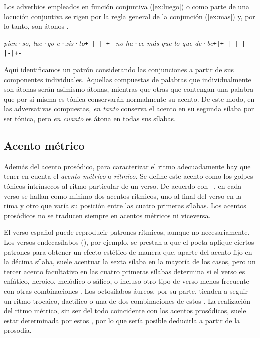 Los adverbios empleados en función conjuntiva (\ref{ex:luego}) o como parte de una locución conjuntiva \parencite[31.6.1b]{rae2010a} se rigen por la regla general de la conjunción (\ref{ex:mas}) y, por lo tanto, son átonos \parencite[]{navarrotomas2004}.
\begin{exe}
	\ex\label{ex:luego} \textit{pien·so, lue·go e·xis·to}\tab\texttt{+-|--|-+-}
	\ex\label{ex:mas} \textit{no ha·ce más que lo que de·be}\tab\texttt{+|+-|-|-|-|-|+-}
\end{exe}

Aquí identificamos un patrón considerando las conjunciones a partir de sus componentes individuales. Aquellas compuestas de palabras que individualmente son átonas serán asimismo átonas, mientras que otras que contengan una palabra que por sí misma es tónica conservarán normalmente su acento. De este modo, en las adversativas compuestas, \textit{en tanto} conserva el acento en su segunda sílaba por ser tónica, pero \textit{en cuanto} es átona en todas sus sílabas.

\subsection{Acento métrico}
Además del acento prosódico, para caracterizar el ritmo adecuadamente hay que tener en cuenta el \textit{acento métrico} o \textit{rítmico}. Se define este acento como los golpes tónicos intrínsecos al ritmo particular de un verso. De acuerdo con \citeauthor{baehr1997}~\parencite*[8-9]{baehr1997}, en cada verso se hallan como mínimo dos acentos rítmicos, uno al final del verso en la rima y otro que varía su posición entre las cuatro primeras sílabas. Los acentos prosódicos no se traducen siempre en acentos métricos ni viceversa.

El verso español puede reproducir patrones rítmicos, aunque no necesariamente. Los versos endecasílabos (), por ejemplo, se prestan a que el poeta aplique ciertos patrones para obtener un efecto estético de manera que, aparte del acento fijo en la décima sílaba, suele acentuar la sexta sílaba en la mayoría de los casos, pero un tercer acento facultativo en las cuatro primeras sílabas determina si el verso es enfático, heroico, melódico o sáfico, o incluso otro tipo de verso menos frecuente con otras combinaciones \parencite[22]{quilis2013}. Los octosílabos áureos, por su parte, tienden a seguir un ritmo trocaico, dactílico o una de dos combinaciones de estos \parencites[93-94]{torre2000}[274-275]{navarrotomas1991}. La realización del ritmo métrico, sin ser del todo coincidente con los acentos prosódicos, suele estar determinada por estos \parencite[26]{baehr1997}, por lo que sería posible deducirla a partir de la prosodia. 

